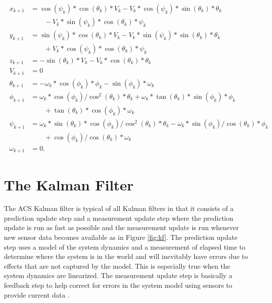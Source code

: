 \begin{align}
\label{eq:kfnonlineardynamics}
\begin{split}
x_{k+1} &= \cos(\psi_k)*\cos(\theta_k)*V_k - V_k*\cos(\psi_k)*\sin(\theta_k)*\theta_k \\
&\qquad- V_k*\sin(\psi_k)*\cos(\theta_k)*\psi_k \\
y_{k+1} &= \sin(\psi_k)*\cos(\theta_k)*V_k - V_k*\sin(\psi_k)*\sin(\theta_k)*\theta_k \\
&\qquad+ V_k*\cos(\psi_k)*\cos(\theta_k)*\psi_k \\
z_{k+1} &= -\sin(\theta_k)*V_k - V_k*\cos(\theta_k)*\theta_k \\
V_{k+1} &= 0 \\
\theta_{k+1} &= -\omega_k *\cos(\phi_k)*\phi_k - \sin(\phi_k)*\omega_k \\
\phi_{k+1} &= \omega_k *\cos(\phi_k)/\cos^2(\theta_k)*\theta_k + \omega_k *\tan(\theta_k)*\sin(\phi_k)*\phi_k \\
&\qquad+ \tan(\theta_k)*\cos(\phi_k)*\omega_k \\
\psi_{k+1} &= \omega_k *\sin(\theta_k)*\cos(\phi_k)/\cos^2(\theta_k)*\theta_k - \omega_k *\sin(\phi_k)/\cos(\theta_k)*\phi_k \\
&\qquad+ \cos(\phi_k)/\cos(\theta_k)*\omega_k \\
\omega_{k+1} &= 0.
\end{split}
\end{align}

\section{The Kalman Filter}
\label{sec:kalmanfilter}
The ACS Kalman filter is typical of all Kalman filters in that it consists of a prediction update step and a measurement update step where the prediction update is run as fast as possible and the measurement update is run whenever new sensor data becomes available as in Figure \ref{fig:kf}. The prediction update step uses a model of the system dynamics and a measurement of elapsed time to determine where the system is in the world and will inevitably have errors due to effects that are not captured by the model. This is especially true when the system dynamics are linearized. The measurement update step is basically a feedback step to help correct for errors in the system model using sensors to provide current data \cite{Kelly_1994_338}.

